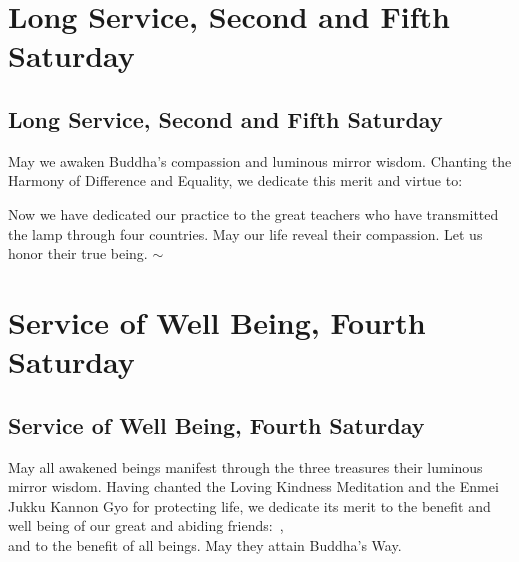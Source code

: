 \documentclass{kdo}
\begin{document}
\begin{services}
\part{Long Service, Second and Fifth Saturday}
\chapter{Long Service, Second and Fifth Saturday}

\begin{service}
\kokyo \makaHannyaHaramittaShingyo
\kokyo \shosaimyoKichijoDharani
\kokyo {}
\sangha \allBuddhas*
\kokyo \harmonyOfDifferenceAndEquality
\kokyo May we awaken Buddha's compassion and luminous mirror wisdom. Chanting
the Harmony of Difference and Equality, we dedicate this merit and virtue to: \clank

\begin{outdent}
  \ancestorsLong*
\end{outdent}

\kokyo Now we have dedicated our practice to the great teachers who have
transmitted the lamp through four countries. May our life reveal their
compassion. Let us honor their true being. $\sim$ \largebell
\end{service}

\part{Service of Well Being, Fourth Saturday}
\chapter{Service of Well Being, Fourth Saturday}
\begin{service}
\kokyo \makaHannyaHaramittaShingyo
\kokyo \shosaimyoKichijoDharani
\kokyo {}
\kokyo \lovingKindnessMeditation
\kokyo \enmeiJukkuKannonGyo
\kokyo May all awakened beings manifest through the three treasures their
luminous mirror wisdom. Having chanted the Loving Kindness Meditation and the
Enmei Jukku Kannon Gyo for protecting life, we dedicate its merit to the
benefit and well being of our great and abiding friends: \hrulefill\,,\\
and to the benefit of all beings. May they attain Buddha's Way. \largebell
\end{service}
\end{services}
\end{document}

